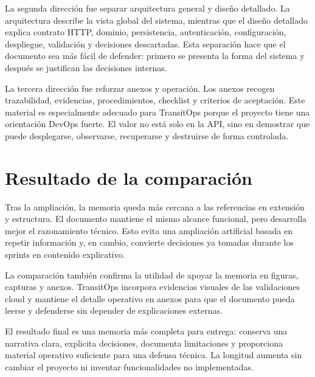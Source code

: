 La segunda dirección fue separar arquitectura general y diseño detallado. La arquitectura describe la vista global del sistema, mientras que el diseño detallado explica contrato HTTP, dominio, persistencia, autenticación, configuración, despliegue, validación y decisiones descartadas. Esta separación hace que el documento sea más fácil de defender: primero se presenta la forma del sistema y después se justifican las decisiones internas.

La tercera dirección fue reforzar anexos y operación. Los anexos recogen trazabilidad, evidencias, procedimientos, checklist y criterios de aceptación. Este material es especialmente adecuado para TransitOps porque el proyecto tiene una orientación DevOps fuerte. El valor no está solo en la API, sino en demostrar que puede desplegarse, observarse, recuperarse y destruirse de forma controlada.

\section{Resultado de la comparación}
\label{sec:resultado-comparacion}

Tras la ampliación, la memoria queda más cercana a las referencias en extensión y estructura. El documento mantiene el mismo alcance funcional, pero desarrolla mejor el razonamiento técnico. Esto evita una ampliación artificial basada en repetir información y, en cambio, convierte decisiones ya tomadas durante los sprints en contenido explicativo.

La comparación también confirma la utilidad de apoyar la memoria en figuras, capturas y anexos. TransitOps incorpora evidencias visuales de las validaciones cloud y mantiene el detalle operativo en anexos para que el documento pueda leerse y defenderse sin depender de explicaciones externas.

El resultado final es una memoria más completa para entrega: conserva una narrativa clara, explicita decisiones, documenta limitaciones y proporciona material operativo suficiente para una defensa técnica. La longitud aumenta sin cambiar el proyecto ni inventar funcionalidades no implementadas.
